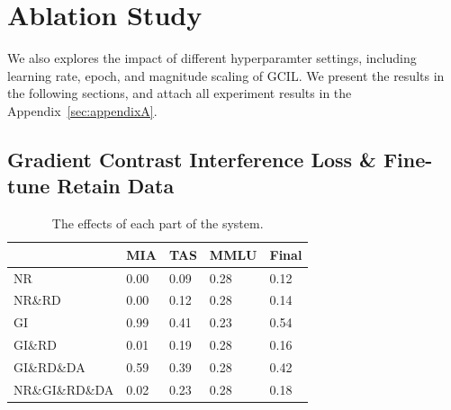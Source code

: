 \documentclass[11pt]{article}
\begin{document}


\section{Ablation Study}
\label{sec:Ablation}


We also explores the impact of different hyperparamter settings, including learning rate, epoch, and magnitude scaling of GCIL. We present the results in the following sections, and attach all experiment results in the Appendix~\ref{sec:appendixA}.
\iffalse
\subsection{Gradient Contrast Interference Loss \& Fine-tune Retain Data} 

\begin{table}[h]\footnotesize
  \centering
    \begin{tabular}{l|l|l|l|l}
    \hline
        ~ & MIA & TAS & MMLU & Final \\ \hline
        NR & 0.00 & 0.09 & 0.28 & 0.12 \\ \hline
        NR\&RD & 0.00 & 0.12 & 0.28 & 0.14 \\ \hline
        GI & 0.99 & 0.41 & 0.23 & 0.54 \\ \hline
        GI\&RD & 0.01 & 0.19 & 0.28 & 0.16 \\ \hline
        GI\&RD\&DA & 0.59 & 0.39 & 0.28 & 0.42 \\ \hline
        NR\&GI\&RD\&DA & 0.02 & 0.23 & 0.28 & 0.18 \\ \hline
    \end{tabular}
  \caption{The effects of each part of the system.}
  \label{tab:accents}
\end{table}
\end{document}

